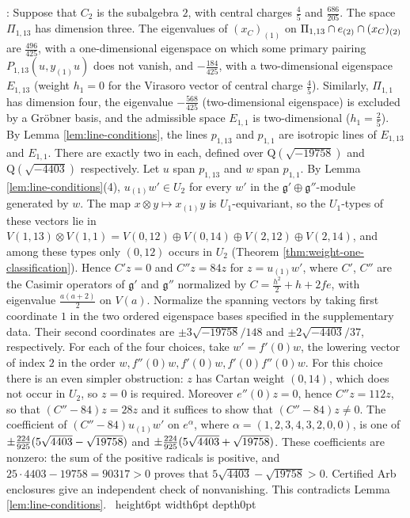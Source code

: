 \documentclass[leqno]{article}
\newcommand{\Q}{\mathrm{Q}}
\newcommand{\qed}{\hfill \vrule height6pt  width6pt depth0pt}
\newcommand{\ot}{\otimes}
\let\i\relax
\newcommand{\i}{\mathrm{i}}
\let\ker\relax
\DeclareMathOperator{\ker}{Ker}
\newenvironment{proof}[1][]{\noindent {\it Proof #1} : }{\hbox{~}\qed
\smallskip
}
\numberwithin{equation}{section}
\begin{document}
\begin{proof}
Suppose that $C_2$ is the subalgebra $2$, with central charges $\frac45$ and $\frac{686}{205}$. The space $\Pi_{1,13}$ has dimension three. The eigenvalues of $(x_C)_{(1)}$ on $\Pi_{1,13} \cap \ker e_{(2)} \cap \ker (x_C)_{(2)}$ are $\frac{496}{425}$, with a one-dimensional eigenspace on which some primary pairing $P_{1,13}(u,y_{(1)}u)$ does not vanish, and $-\frac{184}{425}$, with a two-dimensional eigenspace $E_{1,13}$ (weight $h_1 = 0$ for the Virasoro vector of central charge $\frac45$). Similarly, $\Pi_{1,1}$ has dimension four, the eigenvalue $-\frac{568}{425}$ (two-dimensional eigenspace) is excluded by a Gröbner basis, and the admissible space $E_{1,1}$ is two-dimensional ($h_1 = \frac25$). By Lemma \ref{lem:line-conditions}, the lines $p_{1,13}$ and $p_{1,1}$ are isotropic lines of $E_{1,13}$ and $E_{1,1}$. There are exactly two in each, defined over $\Q(\sqrt{-19758})$ and $\Q(\sqrt{-4403})$ respectively. Let $u$ span $p_{1,13}$ and $w$ span $p_{1,1}$. By Lemma \ref{lem:line-conditions}(4), $u_{(1)}w' \in U_2$ for every $w'$ in the $\mathfrak g' \oplus \mathfrak g''$-module generated by $w$. The map $x \ot y \mapsto x_{(1)}y$ is $U_1$-equivariant, so the $U_1$-types of these vectors lie in $V(1,13) \ot V(1,1) = V(0,12) \oplus V(0,14) \oplus V(2,12) \oplus V(2,14)$, and among these types only $(0,12)$ occurs in $U_2$ (Theorem \ref{thm:weight-one-classification}). Hence $C'z = 0$ and $C''z = 84z$ for $z = u_{(1)}w'$, where $C'$, $C''$ are the Casimir operators of $\mathfrak g'$ and $\mathfrak g''$ normalized by $C = \frac{h^2}2 + h + 2fe$, with eigenvalue $\frac{a(a+2)}2$ on $V(a)$. Normalize the spanning vectors by taking first coordinate $1$ in the two ordered eigenspace bases specified in the supplementary data. Their second coordinates are $\pm 3\sqrt{-19758}/148$ and $\pm 2\sqrt{-4403}/37$, respectively. For each of the four choices, take $w' = f'(0)w$, the lowering vector of index $2$ in the order $w, f''(0)w, f'(0)w, f'(0)f''(0)w$. For this choice there is an even simpler obstruction: $z$ has Cartan weight $(0,14)$, which does not occur in $U_2$, so $z = 0$ is required. Moreover $e''(0)z = 0$, hence $C''z = 112z$, so that $(C''-84)z = 28z$ and it suffices to show that $(C''-84)z \neq 0$. The coefficient of $(C''-84)u_{(1)}w'$ on $e^\alpha$, where $\alpha = (1,2,3,4,3,2,0,0)$, is one of $\pm \frac{224\i}{925}(5\sqrt{4403}-\sqrt{19758})$ and $\pm \frac{224\i}{925}(5\sqrt{4403}+\sqrt{19758})$. These coefficients are nonzero: the sum of the positive radicals is positive, and $25\cdot 4403-19758 = 90317 > 0$ proves that $5\sqrt{4403}-\sqrt{19758} > 0$. Certified Arb enclosures give an independent check of nonvanishing. This contradicts Lemma \ref{lem:line-conditions}.
\end{proof}
\end{document}
